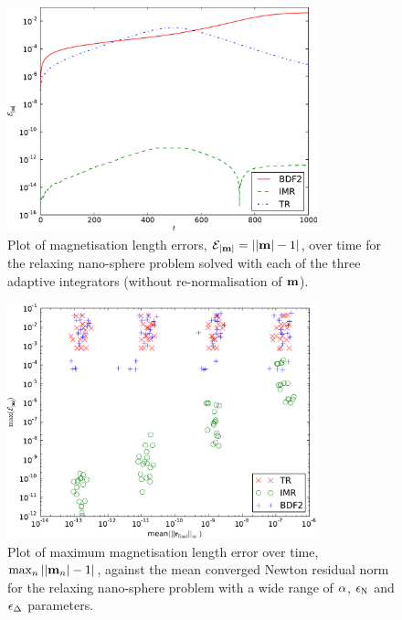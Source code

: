 \begin{figure}
  \centering
  \includegraphics[width=0.8\textwidth]{plots/ode_llg_adaptive_ml/mlengtherrormaxesvstimes}
  \caption{Plot of magnetisation length errors, $\mathcal{E}_{\left|{\boldsymbol{\mathrm{m}}} \right|} = \left|{\left|{\boldsymbol{\mathrm{m}}} \right| -1} \right|$, over time for the relaxing nano-sphere problem solved with each of the three adaptive integrators (without re-normalisation of $\boldsymbol{\mathrm{m}}$).}
  \label{fig:ml-aimr-ode}
\end{figure}

\begin{figure}
  \centering
  \includegraphics[width=0.8\textwidth]{plots/aimr_ode_llg_ml_sweep/maxofmlengtherrormaxesvsmeanminofnewtonresiduals.pdf}
  \caption{Plot of maximum magnetisation length error over time, $\max_n \left|{\left|{\boldsymbol{\mathrm{m}}_n} \right| -1} \right|$, against the mean converged Newton residual norm for the relaxing nano-sphere problem with a wide range of $\alpha$, $\epsilon_{\mathrm{N}}$ and $\epsilon_{\Delta_{}}$ parameters.}
  \label{fig:ml-aimr-newton}
\end{figure}

